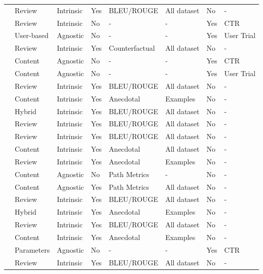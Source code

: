 \begin{tabular}{llllllll}
\cite{10.1145/3539618.3591776} & Review & Intrinsic & Yes & BLEU/ROUGE & All dataset & No & - \\
\cite{rana_daddio_manzato_bridge_2022} & Review & Intrinsic & No & - & - & Yes & CTR \\
\cite{haque_islam_mikalef_2025} & User-based & Agnostic & No & - & - & Yes & User Trial \\
\cite{ranjbar_momtazi_homayoonpour_2024} & Review & Intrinsic & Yes & Counterfactual & All dataset & No & - \\
\cite{caro-martinez_jorro-aragoneses_diaz-agudo_recio-garcia_2024} & Content & Agnostic & No & - & - & Yes & CTR \\
\cite{de_campos_fernandez_luna_huete_2024} & Content & Agnostic & No & - & - & Yes & User Trial \\
\cite{xie_wang_xu_chen_zheng_tang_2024} & Review & Intrinsic & Yes & BLEU/ROUGE & All dataset & No & - \\
\cite{le_abel_gouspillou_2023} & Content & Intrinsic & Yes & Anecdotal & Examples & No & - \\
\cite{bastola_shakya_2024} & Hybrid & Intrinsic & Yes & BLEU/ROUGE & All dataset & No & - \\
\cite{hu_liu_miao_lin_miao_2022} & Review & Intrinsic & Yes & BLEU/ROUGE & All dataset & No & - \\
\cite{zhan_li_li_liu_gupta_kot_2023} & Review & Intrinsic & Yes & BLEU/ROUGE & All dataset & No & - \\
\cite{LI2025110542} & Content & Intrinsic & Yes & Anecdotal & All dataset & No & - \\
\cite{XIE2021235} & Review & Intrinsic & Yes & Anecdotal & Examples & No & - \\
\cite{balloccu_boratto_fenu_marras_2022} & Content & Agnostic & No & Path Metrics & - & No & - \\
\cite{balloccu_boratto_fenu_marras_2023} & Content & Agnostic & Yes & Path Metrics & All dataset & No & - \\
\cite{WU2024111133} & Review & Intrinsic & Yes & BLEU/ROUGE & All dataset & No & - \\
\cite{10.1145/2766462.2767755} & Hybrid & Intrinsic & Yes & Anecdotal & Examples & No & - \\
\cite{10.1145/3340531.3411992} & Review & Intrinsic & Yes & BLEU/ROUGE & All dataset & No & - \\
\cite{10.1145/3292500.3330989} & Content & Intrinsic & Yes & Anecdotal & Examples & No & - \\
\cite{10.1145/3351095.3372852} & Parameters & Agnostic & No & - & - & Yes & CTR \\
\cite{10.1145/3485447.3512031} & Review & Intrinsic & Yes & BLEU/ROUGE & All dataset & No & - \\
\bottomrule
\end{tabular}
